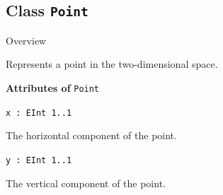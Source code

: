 \subsection{Class \bfseries \texttt{Point}\normalfont}
\label{cls:uppaal::visuals::Point} 
	
	\begin{longdescription}
		\item[Overview] 		
				

	

		Represents a point in the two-dimensional space.		
		
	
			\item[\textbf{Attributes of} \texttt{Point}] ~
			\begin{longdescription}
	\item[\texttt{x : EInt 	\symbol{"5B}1..1\symbol{"5D}
}] ~
	
	
	\nopagebreak
		
				

	

		The horizontal component of the point.		
	\item[\texttt{y : EInt 	\symbol{"5B}1..1\symbol{"5D}
}] ~
	
	
	\nopagebreak
		
				

	

		The vertical component of the point.		
			\end{longdescription}
	
	\end{longdescription}
	
			\newpage
	